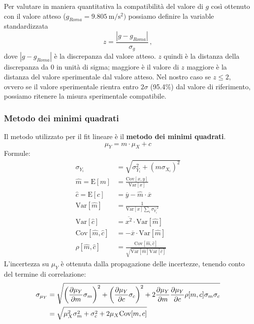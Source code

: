 \documentclass[titlepage]{article}
\numberwithin{equation}{section}
\numberwithin{figure}{section}
\numberwithin{table}{section}
\begin{document}
Per valutare in maniera quantitativa la compatibilità del valore di $g$ così ottenuto con il valore atteso ($g_{Roma} = \SI{9.805}{\metre\per\second\squared})$ possiamo definire la variable standardizzata
\begin{equation}
  z = \frac{|g - g_{Roma}|}{\sigma_g} \,,
\end{equation}
dove $|g - g_{Roma}|$ è la discrepanza dal valore atteso. $z$ quindi è la distanza della discrepanza da 0 in unità di sigma; maggiore è il valore di $z$ maggiore è la distanza del valore sperimentale dal valore atteso. Nel nostro caso se $z \leq 2$, ovvero se il valore sperimentale rientra entro $2 \sigma$ (95.4\%) dal valore di riferimento, possiamo ritenere la misura sperimentale compatibile.

\subsubsection{Metodo dei minimi quadrati}

Il metodo utilizzato per il fit lineare è il \textbf{metodo dei minimi quadrati}.
\begin{equation}
  \mu_Y = m \cdot \mu_X + c
\end{equation}
Formule:
\begin{align}
  \sigma_{Y_i} &= \sqrt{\sigma_{Y_i}^2 + (m \sigma_{X_i})^2} \\
  \hat{m} = \text{E}[m] &= \frac{\text{Cov}[x,y]}{\text{Var}[x]} \\
  \hat{c} = \text{E}[c] &= \overline{y} - \hat{m} \cdot \overline{x} \\
  \text{Var}[\hat{m}] &= \frac{1}{\text{Var}[x] \sum_i \sigma_{Y_i}^{-2}} \\
  \text{Var}[\hat{c}] &= \overline{x^2} \cdot \text{Var}[\hat{m}] \\
  \text{Cov}[\hat{m},\hat{c}] &= -\overline{x} \cdot \text{Var}[\hat{m}] \\
  \rho[\hat{m},\hat{c}] &= \frac{\text{Cov}[\hat{m},\hat{c}]}{\sqrt{\text{Var}[\hat{m}] \text{Var}[\hat{c}]}}
\end{align}
L'incertezza su $\mu_Y$ è ottenuta dalla propagazione delle incertezze, tenendo conto del termine di correlazione:
\begin{align}
  \sigma_{\mu_Y} &= \sqrt{\left( \diffp{\mu_Y}{m} \sigma_m \right)^2 + \left( \diffp{\mu_Y}{c} \sigma_c \right)^2 + 2 \diffp{\mu_Y}{m} \diffp{\mu_Y}{c} \rho[m,c] \sigma_m \sigma_c} \nonumber \\
  &= \sqrt{\mu_X^2 \sigma_m^2 + \sigma_c^2 + 2 \mu_X \text{Cov}[m,c]}
\end{align}
\end{document}
